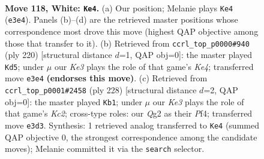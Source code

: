 \documentclass[11pt]{article}
\begin{document}
\clearpage

\begin{figure}[p]\centering
\begin{subfigure}{0.46\textwidth}\centering
\resizebox{\linewidth}{!}{%
\newchessgame
\chessboard[
  setfen={4k3/8/8/8/8/4K3/6Q1/8 w - - 15 118},
  showmover=false,
  pgfstyle=straightmove, color=movearrow, markmove={e3-e4}
]}
\caption{}
\end{subfigure}\hfill
\begin{subfigure}{0.46\textwidth}\centering
\resizebox{\linewidth}{!}{%
\newchessgame
\chessboard[
  setfen={8/k7/8/1Q6/4K3/8/8/8 w - - 7 111},
  showmover=false,
  pgfstyle=straightmove, color=movearrow, markmove={e4-d5}
]}
\caption{}
\end{subfigure}
\\[4pt]
\begin{subfigure}{0.46\textwidth}\centering
\resizebox{\linewidth}{!}{%
\newchessgame
\chessboard[
  setfen={8/8/8/2k5/5P2/8/2K5/8 w - - 0 115},
  showmover=false,
  pgfstyle=straightmove, color=movearrow, markmove={c2-b1}
]}
\caption{}
\end{subfigure}\hfill

\caption{\textbf{Move 118, White: \texttt{Ke4}.} (a) Our position; Melanie plays \texttt{Ke4} (\texttt{e3e4}). Panels (b)--(d) are the retrieved master positions whose correspondence most drove this move (highest QAP objective among those that transfer to it). (b) Retrieved from \texttt{ccrl\_top\_p0000\#940} (ply 220) [structural distance $d$=1, QAP obj=0]: the master played \texttt{Kd5}; under $\mu$ our \emph{Ke3} plays the role of that game's \emph{Ke4}; transferred move \texttt{e3e4} \textbf{(endorses this move)}. (c) Retrieved from \texttt{ccrl\_top\_p0001\#2458} (ply 228) [structural distance $d$=2, QAP obj=0]: the master played \texttt{Kb1}; under $\mu$ our \emph{Ke3} plays the role of that game's \emph{Kc2}; cross-type roles: our \emph{Q}g2 as their \emph{P}f4; transferred move \texttt{e3d3}. Synthesis: 1 retrieved analog transferred to \texttt{Ke4} (summed QAP objective 0, the strongest correspondence among the candidate moves); Melanie committed it via the \texttt{search} selector.}
\label{fig:thought-m234}
\end{figure}

\clearpage
\end{document}
